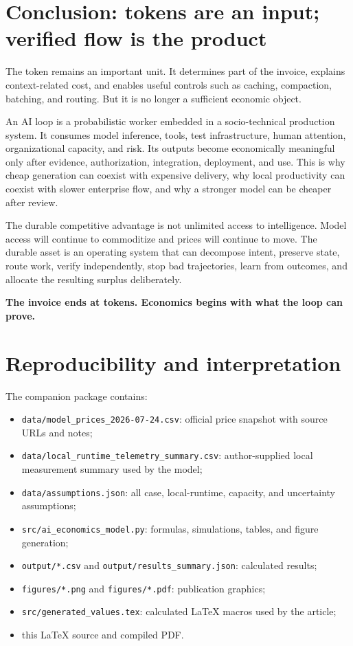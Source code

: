\documentclass[11pt]{article}
\begin{document}
\section{Conclusion: tokens are an input; verified flow is the product}

The token remains an important unit. It determines part of the invoice, explains context-related cost, and enables useful controls such as caching, compaction, batching, and routing. But it is no longer a sufficient economic object.

An AI loop is a probabilistic worker embedded in a socio-technical production system. It consumes model inference, tools, test infrastructure, human attention, organizational capacity, and risk. Its outputs become economically meaningful only after evidence, authorization, integration, deployment, and use. This is why cheap generation can coexist with expensive delivery, why local productivity can coexist with slower enterprise flow, and why a stronger model can be cheaper after review.

The durable competitive advantage is not unlimited access to intelligence. Model access will continue to commoditize and prices will continue to move. The durable asset is an operating system that can decompose intent, preserve state, route work, verify independently, stop bad trajectories, learn from outcomes, and allocate the resulting surplus deliberately.

\begin{resultbox}
\centering
\textbf{The invoice ends at tokens. Economics begins with what the loop can prove.}
\end{resultbox}

\appendix
\section{Reproducibility and interpretation}

The companion package contains:

\begin{itemize}
\item \texttt{data/model\_prices\_2026-07-24.csv}: official price snapshot with source URLs and notes;
\item \texttt{data/local\_runtime\_telemetry\_summary.csv}: author-supplied local measurement summary used by the model;
\item \texttt{data/assumptions.json}: all case, local-runtime, capacity, and uncertainty assumptions;
\item \texttt{src/ai\_economics\_model.py}: formulas, simulations, tables, and figure generation;
\item \texttt{output/*.csv} and \texttt{output/results\_summary.json}: calculated results;
\item \texttt{figures/*.png} and \texttt{figures/*.pdf}: publication graphics;
\item \texttt{src/generated\_values.tex}: calculated LaTeX macros used by the article;
\item this LaTeX source and compiled PDF.
\end{itemize}
\end{document}
